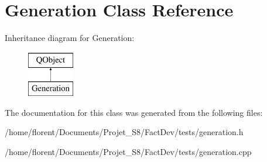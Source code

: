 \hypertarget{classGeneration}{\section{Generation Class Reference}
\label{classGeneration}
}
Inheritance diagram for Generation\-:\begin{figure}[H]
\begin{center}
\leavevmode
\includegraphics[height=2.000000cm]{d4/df7/classGeneration}
\end{center}
\end{figure}


The documentation for this class was generated from the following files\-:\begin{DoxyCompactItemize}
\item 
/home/florent/\-Documents/\-Projet\-\_\-\-S8/\-Fact\-Dev/tests/generation.\-h\item 
/home/florent/\-Documents/\-Projet\-\_\-\-S8/\-Fact\-Dev/tests/generation.\-cpp\end{DoxyCompactItemize}
